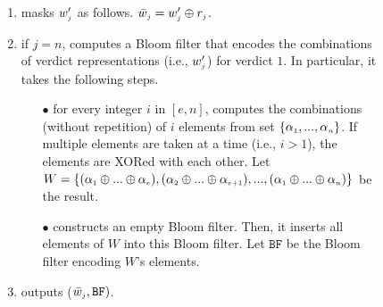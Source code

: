 \begin{figure}[!htp]
\begin{center}
\begin{tcolorbox}[enhanced,width=83mm, height=97mm, left=0mm,
    drop fuzzy shadow southwest,
    colframe=black,colback=white]
{{\begin{enumerate}[leftmargin=5.2mm]
%
%
\begin{equation*}
   w'_{\st j}= 
\begin{cases}
   0,              & \text{if } w_{\st j}=0\\
   \alpha_{\st j}=\mathtt{PRF}(\bar k_{\st 0}, 2||o||j||\text{ID}) ,& \text{if } w_{\st j}=1\\

\end{cases}
\end{equation*}
%
\item masks  $w'_{\scriptscriptstyle j}$ as follows. %
%
$\bar w_{\scriptscriptstyle j}= w'_{\scriptscriptstyle j}\oplus r_{\scriptscriptstyle j}$.
%
\item if $j=n$, computes a Bloom filter that encodes the combinations of verdict representations (i.e., $w'_{\scriptscriptstyle j}$)  for verdict $1$. In particular, it takes the following steps. 
\begin{itemize}[leftmargin=4.2mm]
%
\item[$\bullet$] for every integer $i$ in $[e,n]$, computes the combinations (without repetition) of $i$ elements from set $\{\alpha_{\scriptscriptstyle 1},..., \alpha_{\scriptscriptstyle n}\}$. If multiple elements are taken at a time (i.e., $i>1$), the elements are XORed with each other. Let $W=\{(\alpha_{\scriptscriptstyle 1}\oplus... \oplus \alpha_{\scriptscriptstyle e}), (\alpha_{\scriptscriptstyle 2}\oplus ... \oplus \alpha_{\scriptscriptstyle e+1}), ..., (\alpha_{\scriptscriptstyle 1}\oplus... \oplus \alpha_{\scriptscriptstyle n})\}$ be the result.  
%
\item[$\bullet$] constructs an empty Bloom filter. Then, it inserts all elements of $W$ into this Bloom filter. Let $\mathtt{BF}$ be the Bloom filter encoding $W$'s elements. 

\end{itemize}
%

%
\item outputs ($\bar{ w}_{\scriptscriptstyle j}, \mathtt{BF})$.






\end{enumerate}}}
\end{tcolorbox}
\end{center}
\end{figure}
